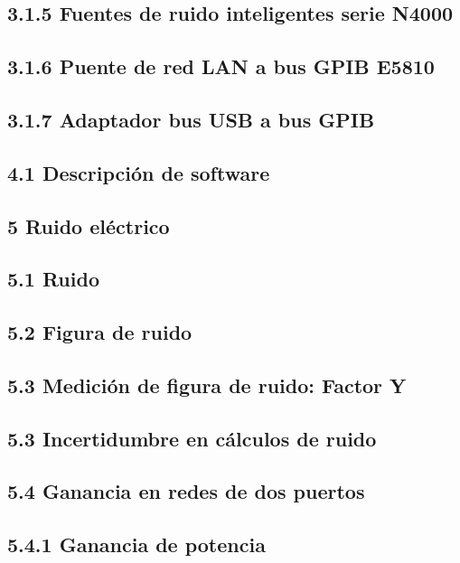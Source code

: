\documentclass[paper=letter,oneside,fontsize=10pt,parskip=full]{article}
\begin{document}
\subsection{3.1.5 Fuentes de ruido inteligentes serie N4000}
\subsection{3.1.6 Puente de red LAN a bus GPIB E5810}
\subsection[3.1.7 Adaptador bus USB a bus GPIB]{3.1.7 Adaptador bus USB a bus GPIB}
\subsection{}
\subsection{4.1 Descripción de software}
\subsection{5 Ruido eléctrico}
\subsection{}
\subsection{5.1 Ruido}
\subsection{5.2 Figura de ruido}
\subsection{5.3 Medición de figura de ruido: Factor Y}
\subsection{5.3 Incertidumbre en cálculos de ruido}
\subsection{5.4 Ganancia en redes de dos puertos}
\subsection{5.4.1 Ganancia de potencia}
\end{document}
